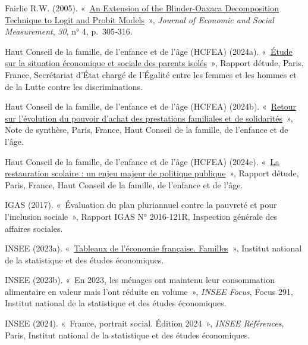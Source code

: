 \documentclass[
  french,
  9pt,
  a4paper,
]{article}
\newlength{\cslhangindent}
\newenvironment{CSLReferences}[2] %
 {\begin{list}{}{%
  \setlength{\itemindent}{0pt}
  \setlength{\leftmargin}{0pt}
  \setlength{\parsep}{0pt}
  \ifodd #1
   \setlength{\leftmargin}{\cslhangindent}
   \setlength{\itemindent}{-1\cslhangindent}
  \fi
  \setlength{\itemsep}{#2\baselineskip}}}
 {\end{list}}
\renewenvironment{CSLReferences}[2] %
    {\begin{list}{}{%
          \setlength{\itemindent}{0pt}
          \setlength{\leftmargin}{0pt}
          \setlength{\parsep}{0pt}
          \ifodd #1
          \setlength{\leftmargin}{\cslhangindent}
          \setlength{\itemindent}{-1\cslhangindent}
          \fi
          \setlength{\itemsep}{0.25\baselineskip}}} %
    {\end{list}}
\begin{document}
\begin{CSLReferences}{0}{1}
Fairlie R.W. (2005). {«~\href{https://doi.org/10.3233/JEM-2005-0259}{An
Extension of the Blinder-Oaxaca Decomposition Technique to Logit and
Probit Models}~»}, \emph{Journal of Economic and Social Measurement},
\emph{30}, n° 4, p.~305‑316.

Haut Conseil de la famille, de l'enfance et de l'âge (HCFEA) (2024a).
{«~\href{https://www.egalite-femmes-hommes.gouv.fr/etude-sur-la-situation-economique-et-sociale-des-parents-isoles-0}{Étude
sur la situation économique et sociale des parents isolés}~»}, Rapport
d\textquotesingle étude, Paris, France, Secrétariat d'État chargé de
l'Égalité entre les femmes et les hommes et de la Lutte contre les
discriminations.

Haut Conseil de la famille, de l'enfance et de l'âge (HCFEA) (2024b).
{«~\href{https://hcfea.gouv.fr/retour-sur-levolution-du-pouvoir-dachat-des-prestations-familiales-et-de-solidarites}{Retour
sur l'évolution du pouvoir d'achat des prestations familiales et de
solidarités}~»}, Note de synthèse, Paris, France, Haut Conseil de la
famille, de l'enfance et de l'âge.

Haut Conseil de la famille, de l'enfance et de l'âge (HCFEA) (2024c).
{«~\href{https://hcfea.gouv.fr/la-restauration-scolaire-un-enjeu-majeur-de-politique-publique}{La
restauration scolaire : un enjeu majeur de politique publique}~»},
Rapport d\textquotesingle étude, Paris, France, Haut Conseil de la
famille, de l'enfance et de l'âge.

IGAS (2017). {«~Évaluation du plan pluriannuel contre la pauvreté et
pour l'inclusion sociale~»}, Rapport IGAS N° 2016-121R, Inspection
générale des affaires sociales.

INSEE (2023a).
{«~\href{https://www.insee.fr/fr/statistiques/7707241}{Tableaux de
l'économie française. Familles}~»}, Institut national de la statistique
et des études économiques.

INSEE (2023b). {«~En 2023, les ménages ont maintenu leur consommation
alimentaire en valeur mais l'ont réduite en volume~»}, \emph{INSEE
Focus}, Focus 291, Institut national de la statistique et des études
économiques.

INSEE (2024). {«~France, portrait social. Édition 2024~»}, \emph{INSEE
Références}, Paris, Institut national de la statistique et des études
économiques.


\end{CSLReferences}
\end{document}
